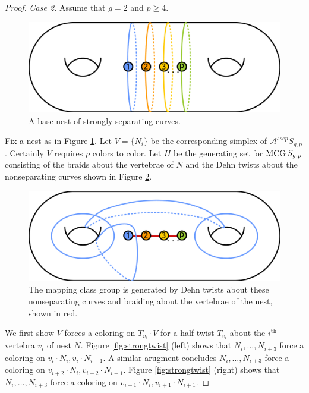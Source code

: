 \begin{proof}
\emph{Case 2.} Assume that $g=2$ and $p \geq 4$.

\begin{figure}[h!]
  \centering
  \includegraphics[width=.5\textwidth]{figures/strongnest.pdf}
  \caption{A base nest of strongly separating curves.}
  \label{fig:strongnest}
\end{figure}

Fix a nest as in Figure \ref{fig:strongnest}.
Let $V=\{N_i\}$ be the corresponding simplex of $\mathcal A^{ssep} S_{g,p}$.
Certainly $V$ requires $p$ colors to color.
Let $H$ be the generating set for $\operatorname{MCG} S_{g,p}$ consisting of the braids about
the vertebrae of $N$ and the Dehn twists about the nonseparating curves shown in Figure \ref{fig:strongtwists}.

\begin{figure}[h!]
  \centering
  \includegraphics[width=.5\textwidth]{figures/strongtwists.pdf}
  \caption{The mapping class group is generated by Dehn twists about these nonseparating curves
  and braiding about the vertebrae of the nest, shown in red.}
  \label{fig:strongtwists}
\end{figure}

We first show $V$ forces a coloring on $T_{v_i} \cdot V$ for a half-twist $T_{v_i}$ about the $i^{\mbox{th}}$ vertebra $v_i$ of nest $N$.
Figure \ref{fig:strongtwist} (left) shows that $N_i, \ldots, N_{i+3}$ force a coloring on $v_i \cdot N_i, v_i \cdot N_{i+1}$.
A similar arugment concludes $N_i, \ldots, N_{i+3}$ force a coloring on $v_{i+2} \cdot N_i, v_{i+2} \cdot N_{i+1}$.
Figure \ref{fig:strongtwist} (right) shows that $N_i, \ldots, N_{i+3}$ force a coloring on $v_{i+1} \cdot N_i, v_{i+1} \cdot N_{i+1}$.


\end{proof}
